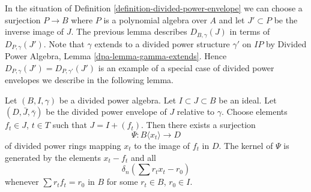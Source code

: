 \noindent
In the situation of Definition \ref{definition-divided-power-envelope}
we can choose a surjection $P \to B$ where $P$ is a polynomial
algebra over $A$ and let $J' \subset P$ be the inverse image of $J$.
The previous lemma describes $D_{B, \gamma}(J)$ in terms of
$D_{P, \gamma}(J')$. Note that $\gamma$ extends to a divided power
structure $\gamma'$ on $IP$ by
Divided Power Algebra, Lemma \ref{dpa-lemma-gamma-extends}. Hence
$D_{P, \gamma}(J') = D_{P, \gamma'}(J')$ is an example of a special
case of divided power envelopes we describe in the following lemma.

\begin{lemma}
\label{lemma-describe-divided-power-envelope}
Let $(B, I, \gamma)$ be a divided power algebra. Let $I \subset J \subset B$
be an ideal. Let $(D, \bar J, \bar \gamma)$ be the divided power envelope
of $J$ relative to $\gamma$. Choose elements $f_t \in J$, $t \in T$ such
that $J = I + (f_t)$. Then there exists a surjection
$$
\Psi : B\langle x_t \rangle \longrightarrow D
$$
of divided power rings mapping $x_t$ to the image of $f_t$ in $D$.
The kernel of $\Psi$ is generated by the elements $x_t - f_t$ and
all
$$
\delta_n\left(\sum r_t x_t - r_0\right)
$$
whenever $\sum r_t f_t = r_0$ in $B$ for some $r_t \in B$, $r_0 \in I$.
\end{lemma}

